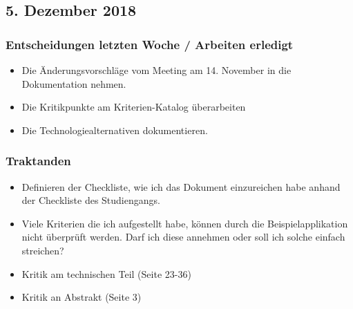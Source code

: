 \documentclass{article}
\begin{document}
    
\subsection{5. Dezember 2018} \label{chap:Protokols:5dec2018}

\subsubsection{Entscheidungen letzten Woche / Arbeiten erledigt}
\begin{itemize}
    \item Die Änderungsvorschläge vom Meeting am 14. November in die Dokumentation nehmen.
    \item Die Kritikpunkte am Kriterien-Katalog überarbeiten
    \item Die Technologiealternativen dokumentieren.\checkmark
\end{itemize}

\subsubsection{Traktanden}
\begin{itemize}
    \item Definieren der Checkliste, wie ich das Dokument einzureichen habe anhand der Checkliste des Studiengangs.
    \item Viele Kriterien die ich aufgestellt habe, können durch die Beispielapplikation nicht überprüft werden. Darf ich diese annehmen oder soll ich solche einfach streichen?
    \item Kritik am technischen Teil (Seite 23-36)
    \item Kritik an Abstrakt (Seite 3)
\end{itemize}
\end{document}

